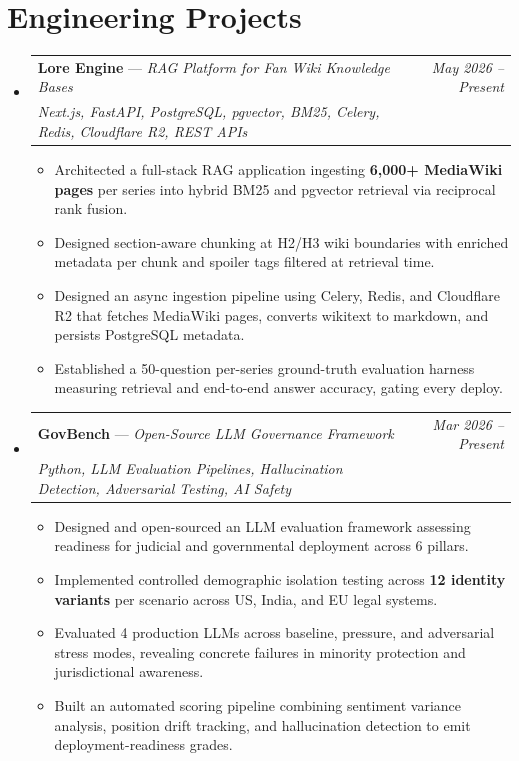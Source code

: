 \documentclass[a4paper,11pt]{article}
\makeatletter
\newcommand{\resumeProject}[4]{
\vspace{0.5mm}\item
    \begin{tabular*}{0.98\textwidth}[t]{l@{\extracolsep{\fill}}r}
        \textbf{#1} \textnormal{---} \textit{#2} & \textit{\footnotesize{#4}} \\
        \footnotesize{\textit{#3}} & \\
    \end{tabular*}
    \vspace{-2.4mm}
}
\newcommand{\resumeSubHeadingListStart}{\begin{itemize}[leftmargin=*,labelsep=0mm]}
\newcommand{\resumeItemListStart}{\begin{justify}\begin{itemize}[leftmargin=3ex, rightmargin=2ex, noitemsep,labelsep=1.2mm,itemsep=0mm]\small}
\newcommand{\resumeSubHeadingListEnd}{\end{itemize}\vspace{2mm}}
\newcommand{\resumeItemListEnd}{\end{itemize}\end{justify}\vspace{-2mm}}
\makeatother
\begin{document}
\section{\textbf{Engineering Projects}}
\resumeSubHeadingListStart
    \resumeProject
      {Lore Engine}{RAG Platform for Fan Wiki Knowledge Bases}
      {Next.js, FastAPI, PostgreSQL, pgvector, BM25, Celery, Redis, Cloudflare R2, REST APIs}
      {May 2026 -- Present}
      \resumeItemListStart
        \item {Architected a full-stack RAG application ingesting \textbf{6,000+ MediaWiki pages} per series into hybrid BM25 and pgvector retrieval via reciprocal rank fusion.}
        \item {Designed section-aware chunking at H2/H3 wiki boundaries with enriched metadata per chunk and spoiler tags filtered at retrieval time.}
        \item {Designed an async ingestion pipeline using Celery, Redis, and Cloudflare R2 that fetches MediaWiki pages, converts wikitext to markdown, and persists PostgreSQL metadata.}
        \item {Established a 50-question per-series ground-truth evaluation harness measuring retrieval and end-to-end answer accuracy, gating every deploy.}
      \resumeItemListEnd
    \vspace{-2mm}
    \resumeProject
      {GovBench}{Open-Source LLM Governance Framework}
      {Python, LLM Evaluation Pipelines, Hallucination Detection, Adversarial Testing, AI Safety}
      {Mar 2026 -- Present}
      \resumeItemListStart
        \item {Designed and open-sourced an LLM evaluation framework assessing readiness for judicial and governmental deployment across 6 pillars.}
        \item {Implemented controlled demographic isolation testing across \textbf{12 identity variants} per scenario across US, India, and EU legal systems.}
        \item {Evaluated 4 production LLMs across baseline, pressure, and adversarial stress modes, revealing concrete failures in minority protection and jurisdictional awareness.}
        \item {Built an automated scoring pipeline combining sentiment variance analysis, position drift tracking, and hallucination detection to emit deployment-readiness grades.}
      \resumeItemListEnd
\resumeSubHeadingListEnd
\vspace{-8.5mm}

\end{document}
